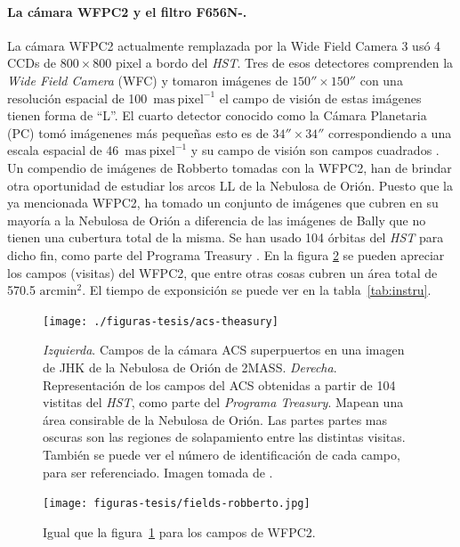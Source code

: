\paragraph{La cámara WFPC2 y el filtro F656N-\ha{}.}
La cámara WFPC2 actualmente remplazada por la Wide Field Camera 3 usó 4 CCDs de $800\times800$ pixel a bordo del \textit{HST}. Tres de esos detectores comprenden la \textit{Wide Field Camera} (WFC) y tomaron imágenes de \(150''\times150''\) con una resolución espacial de 100~\(\mathrm{mas~pixel^{-1}}\) el campo de visión de estas imágenes tienen forma de ``L''. El cuarto detector conocido como la  Cámara Planetaria (PC) tomó imágenenes más pequeñas esto es de \(34''\times34''\) correspondiendo a una escala espacial de 46~\(\mathrm{mas~pixel^{-1}}\) y su campo de visión son campos cuadrados \citep{McMaster:2008}. Un compendio de imágenes de Robberto tomadas con la WFPC2, han de brindar otra oportunidad de estudiar los arcos LL de la Nebulosa de Orión. Puesto que la ya mencionada WFPC2, ha tomado un conjunto de imágenes que cubren en su mayoría a la Nebulosa de Orión a diferencia de las imágenes de Bally que no tienen una cubertura total de la misma. Se han usado 104 órbitas del \textit{HST} para dicho fin, como parte del Programa Treasury \citep{Robberto:2013a}. En la figura \ref{fig:fields-robberto} se pueden apreciar los campos (visitas) del WFPC2, que entre otras cosas cubren un área total de 570.5 \(\text{arcmin}^{2}\). El tiempo de exponsición se puede ver en la tabla~\ref{tab:instru}. \\

\begin{figure}
\centering
  \texttt{[image: ./figuras-tesis/acs-theasury]}
\caption{\textit{Izquierda}. Campos de la cámara ACS superpuertos en una imagen de JHK de la Nebulosa de Orión de 2MASS. \textit{Derecha}. Representación de los campos del ACS obtenidas a partir de 104 vistitas del \textit{HST}, como parte del \textit{Programa Treasury}. Mapean una área consirable de la Nebulosa de Orión. Las partes partes mas oscuras son las regiones de solapamiento entre las distintas visitas. También se puede ver el número de identificación de cada campo, para ser referenciado. Imagen tomada de \citet{Robberto:2013a}. }\label{fig:field-acs-the}
\end{figure}

\begin{figure}
  \centering
  \texttt{[image: figuras-tesis/fields-robberto.jpg]}
  \caption{Igual que la figura~\ref{fig:field-acs-the} para los campos de WFPC2.}
  \label{fig:fields-robberto}
\end{figure}

